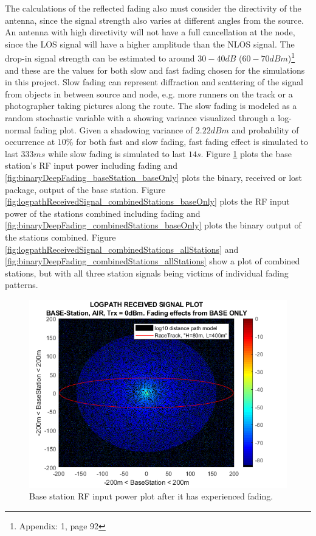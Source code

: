 \noindent The calculations of the reflected fading also must consider the directivity of the antenna, since the signal strength also varies at different angles from the source. An antenna with high directivity will not have a full cancellation at the node, since the LOS signal will have a higher amplitude than the NLOS signal. The drop-in signal strength can be estimated to around $30-40dB$ ($60-70dBm$)\footnote{Appendix: 1, \cite{Karl2006} page 92} and these are the values for both slow and fast fading chosen for the simulations in this project. Slow fading can represent diffraction and scattering of the signal from objects in between source and node, e.g. more runners on the track or a photographer taking pictures along the route. The slow fading is modeled as a random stochastic variable with a showing variance visualized through a log-normal fading plot. Given a shadowing variance of $2.22dBm$ and probability of occurrence at $10\%$ for both fast and slow fading, fast fading effect is simulated to last $333 ms$ while slow fading is simulated to last $14s$. Figure \ref{fig:logpathReceivedSignal_baseStation_baseOnly} plots the base station's RF input power including fading and \ref{fig:binaryDeepFading_baseStation_baseOnly} plots the binary, received or lost package, output of the base station. Figure \ref{fig:logpathReceivedSignal_combinedStations_baseOnly} plots the RF input power of the stations combined including fading and \ref{fig:binaryDeepFading_combinedStations_baseOnly} plots the binary output of the stations combined. Figure \ref{fig:logpathReceivedSignal_combinedStations_allStations} and \ref{fig:binaryDeepFading_combinedStations_allStations} show a plot of combined stations, but with all three station signals being victims of individual fading patterns.
 
\clearpage %

\begin{figure}[H]
	\centering
	\includegraphics[width=\linewidth]{theory/fading/fig/logpathReceivedSignal_baseStation_baseOnly.png}
	\caption{Base station RF input power plot after it has experienced fading.}
	\label{fig:logpathReceivedSignal_baseStation_baseOnly}
\end{figure}


